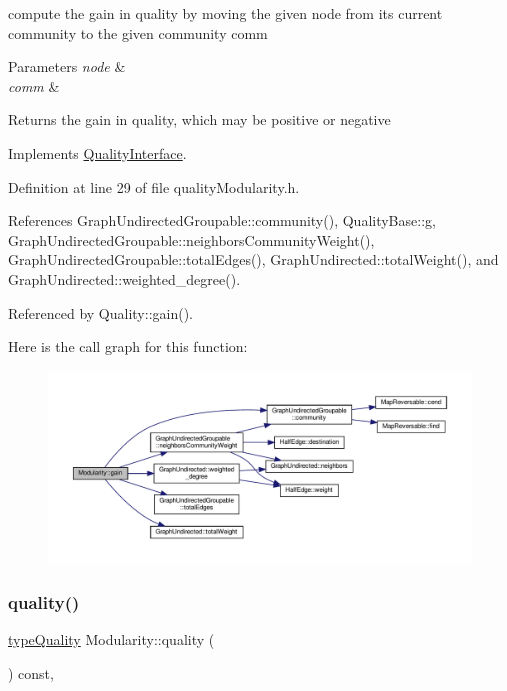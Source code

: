 compute the gain in quality by moving the given node from its current community to the given community comm 
\begin{DoxyParams}{Parameters}
{\em node} & \\
\hline
{\em comm} & \\
\hline
\end{DoxyParams}
\begin{DoxyReturn}{Returns}
the gain in quality, which may be positive or negative 
\end{DoxyReturn}


Implements \hyperlink{classQualityInterface_ab6a2e15d118c3945243abb96c7cc0360}{Quality\+Interface}.



Definition at line 29 of file quality\+Modularity.\+h.



References Graph\+Undirected\+Groupable\+::community(), Quality\+Base\+::g, Graph\+Undirected\+Groupable\+::neighbors\+Community\+Weight(), Graph\+Undirected\+Groupable\+::total\+Edges(), Graph\+Undirected\+::total\+Weight(), and Graph\+Undirected\+::weighted\+\_\+degree().



Referenced by Quality\+::gain().

Here is the call graph for this function\+:
\nopagebreak
\begin{figure}[H]
\begin{center}
\leavevmode
\includegraphics[width=350pt]{classModularity_afb4e750456a0138c2880e679df6d431d_cgraph}
\end{center}
\end{figure}
\mbox{\label{classModularity_ab594c2c6ccde0e9467d7548923612c3a}} 
\subsubsection{\texorpdfstring{quality()}{quality()}}
{\footnotesize\ttfamily \hyperlink{qualityInterface_8h_a15a3ec6041e6e02d00d2eff22c20fd94}{type\+Quality} Modularity\+::quality (\begin{DoxyParamCaption}{ }\end{DoxyParamCaption}) const\hspace{0.3cm}{\ttfamily [inline]}, {\ttfamily [virtual]}}

